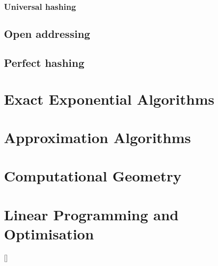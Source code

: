 \documentclass[12pt]{article}
\begin{document}
\subsubsection{Universal hashing}
\subsection{Open addressing}
\subsection{Perfect hashing}
\newpage

\section{Exact Exponential Algorithms}
\newpage

\section{Approximation Algorithms}
\newpage

\section{Computational Geometry}
\newpage

\section{Linear Programming and Optimisation}
[\cite{monoids}]

\newpage

%



\end{document}

